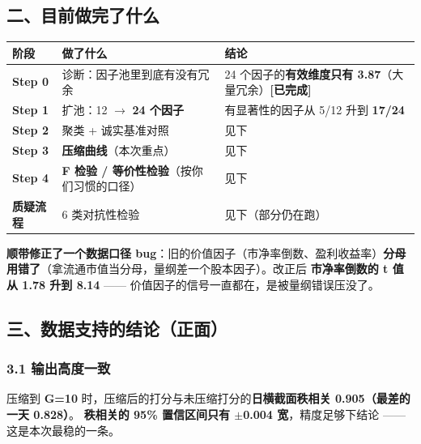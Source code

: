 \documentclass[11pt]{article}
\begin{document}
\subsection{\texorpdfstring{二、目前做完了什么}{二、目前做完了什么}}
{\small
\begin{longtable}{p{1.92cm}p{6.90cm}p{7.38cm}}
\toprule
阶段 & 做了什么 & 结论 \\
\midrule
\textbf{Step 0} & 诊断：因子池里到底有没有冗余 & 24 个因子的\textbf{有效维度只有 3.87}（大量冗余）\textbf{[已完成]} \\
\textbf{Step 1} & 扩池：12 \ensuremath{\rightarrow} \textbf{24 个因子} & 有显著性的因子从 5/12 升到 \textbf{17/24} \\
\textbf{Step 2} & 聚类 + 诚实基准对照 & 见下 \\
\textbf{Step 3} & \textbf{压缩曲线}（本次重点） & 见下 \\
\textbf{Step 4} & \textbf{F 检验 / 等价性检验}（按你们习惯的口径） & 见下 \\
\textbf{质疑流程} & 6 类对抗性检验 & 见下（部分仍在跑） \\
\bottomrule
\end{longtable}
}
\textbf{顺带修正了一个数据口径 bug}：旧的价值因子（市净率倒数、盈利收益率）\textbf{分母用错了}（拿流通市值当分母，量纲差一个股本因子）。改正后 \textbf{市净率倒数的 t 值从 1.78 升到 8.14} ------ 价值因子的信号一直都在，是被量纲错误压没了。
\subsection{\texorpdfstring{三、数据支持的结论（正面）}{三、数据支持的结论（正面）}}
\subsubsection{\texorpdfstring{3.1 输出高度一致}{3.1 输出高度一致}}
压缩到 \textbf{G=10} 时，压缩后的打分与未压缩打分的\textbf{日横截面秩相关 0.905（最差的一天 0.828）}。
\textbf{秩相关的 95\% 置信区间只有 \ensuremath{\pm}0.004 宽}，精度足够下结论 ------ 这是本次最稳的一条。
\end{document}
